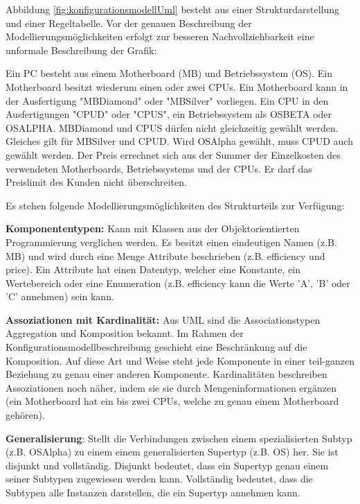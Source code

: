 \documentclass[12pt,a4paper,bibliography=totocnumbered,listof=totoc]{scrartcl}
\begin{document}
Abbildung \ref{fig:konfigurationsmodellUml} besteht aus einer Strukturdarstellung und einer Regeltabelle. Vor der genauen Beschreibung der Modellierungsmöglichkeiten erfolgt zur besseren Nachvollziehbarkeit eine unformale Beschreibung der Grafik:

Ein PC besteht aus einem Motherboard (MB) und Betriebssystem (OS). Ein Motherboard besitzt wiederum einen oder zwei CPUs. Ein Motherboard kann in der Ausfertigung "MBDiamond" oder "MBSilver" vorliegen. Ein CPU in den Ausfertigungen "CPUD" oder "CPUS", ein Betriebssystem als OSBETA oder OSALPHA. MBDiamond und CPUS dürfen nicht gleichzeitig gewählt werden. Gleiches gilt für MBSilver und CPUD. Wird OSAlpha gewählt, muss CPUD auch gewählt werden. Der Preis errechnet sich aus der Summer der Einzelkosten des verwendeten Motherboards, Betriebssystems und der CPUs. Er darf das Preislimit des Kunden nicht überschreiten.

Es stehen folgende Modellierungsmöglichkeiten des Strukturteils zur Verfügung:
\begin{compactitem}
\item \textbf{Komponententypen:} Kann mit Klassen aus der Objektorientierten Programmierung verglichen werden. Es besitzt einen eindeutigen Namen (z.B. MB) und wird durch eine Menge Attribute beschrieben (z.B. efficiency und price). Ein Attribute hat einen Datentyp, welcher eine Konstante, ein Wertebereich oder eine Enumeration (z.B. efficiency kann die Werte 'A', 'B' oder 'C' annehmen) sein kann.
\item \textbf{Assoziationen mit Kardinalität:} Aus UML sind die Associationstypen Aggregation und Komposition bekannt. Im Rahmen der Konfigurationsmodellbeschreibung geschieht eine Beschränkung auf die Komposition. Auf diese Art und Weise steht jede Komponente in einer teil-ganzen Beziehung zu genau einer anderen Komponente. Kardinalitäten beschreiben Assoziationen noch näher, indem sie sie durch Mengeninformationen ergänzen (ein Motherboard hat ein bis zwei CPUs, welche zu genau einem Motherboard gehören).
\item \textbf{Generalisierung}: Stellt die Verbindungen zwischen einem spezialisierten Subtyp (z.B. OSAlpha) zu einem einem generalisierten Supertyp (z.B. OS) her. Sie ist disjunkt und vollständig. Disjunkt bedeutet, dass ein Supertyp genau einem seiner Subtypen zugewiesen werden kann. Vollständig bedeutet, dass die Subtypen alle Instanzen darstellen, die ein Supertyp annehmen kann.
\end{compactitem}
\end{document}
